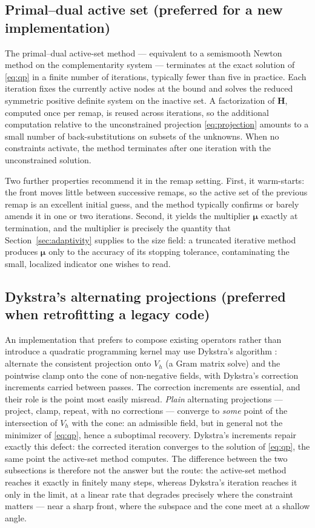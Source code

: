 \documentclass[11pt]{article}
\newcommand{\bs}[1]{\boldsymbol{#1}}
\begin{document}
\subsection{Primal--dual active set (preferred for a new implementation)}
\label{sec:pdas}

The primal--dual active-set method --- equivalent to a semismooth Newton
method on the complementarity system \cite{hintermuller2003} ---
terminates at the exact solution of \eqref{eq:qp} in a finite number of
iterations, typically fewer than five in practice. Each iteration fixes the currently
active nodes at the bound and solves the reduced symmetric positive
definite system on the inactive set. A factorization of $\bs{H}$,
computed once per remap, is reused across iterations, so the additional
computation relative to the unconstrained projection
\eqref{eq:projection} amounts to a small number of back-substitutions
on subsets of the unknowns. When
no constraints activate, the method terminates after one iteration with
the unconstrained solution.

Two further properties recommend it in the remap setting. First, it
warm-starts: the front moves little between successive remaps, so the
active set of the previous remap is an excellent initial guess, and the
method typically confirms or barely amends it in one or two iterations.
Second, it yields the multiplier $\bs{\mu}$ exactly at termination,
and the multiplier is precisely the quantity that
Section~\ref{sec:adaptivity} supplies to the size field: a truncated
iterative method produces $\bs{\mu}$ only to the accuracy of its
stopping tolerance, contaminating the small, localized indicator one
wishes to read.

\subsection{Dykstra's alternating projections (preferred when
retrofitting a legacy code)}
\label{sec:dykstra}

An implementation that prefers to compose existing operators rather than
introduce a quadratic programming kernel may use Dykstra's algorithm
\cite{boyle1986}: alternate the consistent projection onto $V_h$ (a Gram
matrix solve) and the pointwise clamp onto the cone of non-negative
fields, with Dykstra's correction increments carried between passes.
The correction increments are essential, and their role is the point
most easily misread. \emph{Plain} alternating projections --- project,
clamp, repeat, with no corrections --- converge to \emph{some} point of
the intersection of $V_h$ with the cone: an admissible field, but in
general not the minimizer of \eqref{eq:qp}, hence a suboptimal recovery.
Dykstra's increments repair exactly this defect: the corrected iteration
converges to the solution of \eqref{eq:qp}, the same point the
active-set method computes. The difference between the two subsections
is therefore not the answer but the route: the active-set method reaches
it exactly in finitely many steps, whereas Dykstra's iteration reaches
it only in the limit, at a linear rate that degrades precisely where the
constraint matters --- near a sharp front, where the subspace and the
cone meet at a shallow angle.
\end{document}
